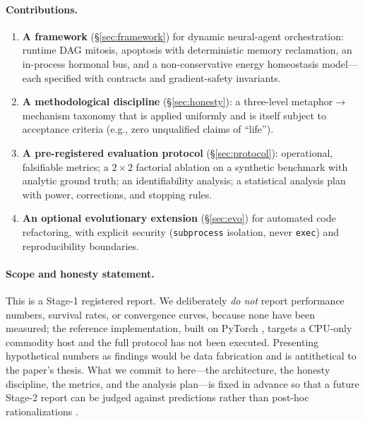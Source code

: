 \documentclass[11pt]{article}
\begin{document}
\paragraph{Contributions.}
\begin{enumerate}[leftmargin=1.4em,itemsep=2pt]
\item \textbf{A framework} (\S\ref{sec:framework}) for dynamic neural-agent
orchestration: runtime DAG mitosis, apoptosis with deterministic memory
reclamation, an in-process hormonal bus, and a non-conservative energy
homeostasis model---each specified with contracts and gradient-safety
invariants.
\item \textbf{A methodological discipline} (\S\ref{sec:honesty}): a three-level
metaphor$\rightarrow$mechanism taxonomy that is applied uniformly and is itself
subject to acceptance criteria (e.g., zero unqualified claims of ``life'').
\item \textbf{A pre-registered evaluation protocol} (\S\ref{sec:protocol}):
operational, falsifiable metrics; a $2\times2$ factorial ablation on a synthetic
benchmark with analytic ground truth; an identifiability analysis; a statistical
analysis plan with power, corrections, and stopping rules.
\item \textbf{An optional evolutionary extension} (\S\ref{sec:evo}) for
automated code refactoring, with explicit security (\texttt{subprocess}
isolation, never \texttt{exec}) and reproducibility boundaries.
\end{enumerate}

\paragraph{Scope and honesty statement.}
This is a Stage-1 registered report. We deliberately \emph{do not} report
performance numbers, survival rates, or convergence curves, because none have
been measured; the reference implementation, built on PyTorch \cite{paszke2019pytorch}, targets
a CPU-only commodity host
and the full protocol has not been executed. Presenting hypothetical numbers as
findings would be data fabrication and is antithetical to the paper's thesis.
What we commit to here---the architecture, the honesty discipline, the metrics,
and the analysis plan---is fixed in advance so that a future Stage-2 report can
be judged against predictions rather than post-hoc rationalizations
\cite{chambers2013registered,pineau2021repro}.

\end{document}
